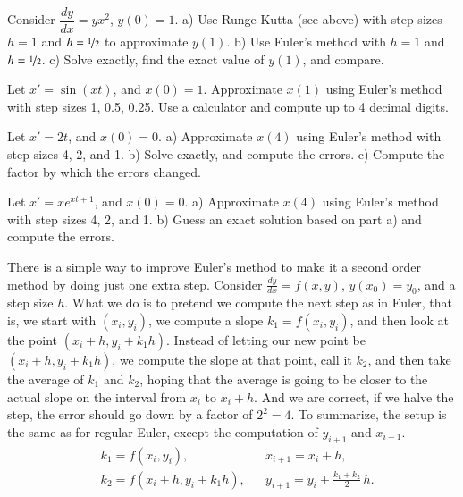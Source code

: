 \documentclass[12pt]{book}
\begin{document}
\begin{exercise}
Consider $\dfrac{dy}{dx} = yx^2$, $y(0)=1$.
a) Use Runge-Kutta (see above) with step sizes $h=1$ and $h=\nicefrac{1}{2}$
to approximate $y(1)$.  b) Use Euler's method with $h=1$ and
$h=\nicefrac{1}{2}$.  c) Solve exactly, find the exact value of
$y(1)$, and compare.
\end{exercise}

\setcounter{exercise}{100}

\begin{exercise}
Let $x' = \sin(xt)$, and $x(0)=1$.
Approximate $x(1)$ using Euler's method with step sizes 1, 0.5, 0.25.
Use a calculator and compute up to 4 decimal digits.
\end{exercise}

\begin{exercise}
Let $x' = 2t$, and $x(0)=0$.
a) Approximate $x(4)$ using Euler's method with step sizes 4, 2, and 1.
b) Solve exactly, and compute the errors.
c) Compute the factor by which the errors changed.
\end{exercise}

\begin{exercise}
Let $x' = x e^{xt+1}$, and $x(0)=0$.
a) Approximate $x(4)$ using Euler's method with step sizes 4, 2, and 1.
b) Guess an exact solution based on part a) and compute the errors.
\end{exercise}

There is a simple way to improve Euler's method to make it a
second order method by doing just one extra step.
Consider $\frac{dy}{dx}=f(x,y)$, $y(x_0) = y_0$,
and a step size $h$.
What we do is to pretend we compute the next step as in Euler,
that is, we start with $(x_i,y_i)$, we compute a
slope $k_1 = f(x_i,y_i)$, and then look at the point $(x_i+h,y_i + k_1h)$.
Instead of letting our new point be $(x_i+h,y_i + k_1h)$, we compute
the slope at that point, call it $k_2$, and then take the average
of $k_1$ and $k_2$, hoping that the average is going to be closer to
the actual slope on the interval from $x_i$ to $x_i+h$.  And we are correct,
if we halve the step, the error should go down by a factor of $2^2 = 4$.
To summarize, the setup is the
same as for regular Euler, except
the computation of $y_{i+1}$ and $x_{i+1}$.
\begin{align*}
& k_1 = f(x_i,y_i) , & & 
x_{i+1} = x_i + h , \\
& k_2 = f(x_i + h,y_i + k_1h) ,
& & y_{i+1} = y_i + \frac{k_1+k_2}{2}\,h .
\end{align*}
\end{document}
